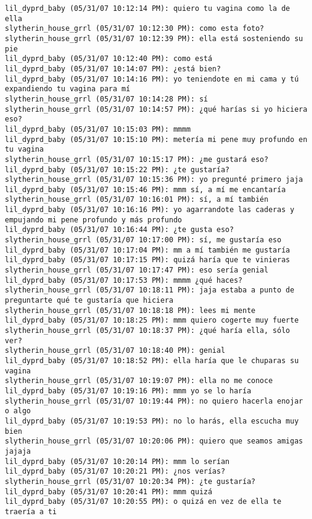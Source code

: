 \begin{verbatim}
lil_dyprd_baby (05/31/07 10:12:14 PM): quiero tu vagina como la de ella
slytherin_house_grrl (05/31/07 10:12:30 PM): como esta foto?
slytherin_house_grrl (05/31/07 10:12:39 PM): ella está sosteniendo su pie
lil_dyprd_baby (05/31/07 10:12:40 PM): como está
lil_dyprd_baby (05/31/07 10:14:07 PM): ¿está bien?
lil_dyprd_baby (05/31/07 10:14:16 PM): yo teniendote en mi cama y tú expandiendo tu vagina para mí
slytherin_house_grrl (05/31/07 10:14:28 PM): sí
slytherin_house_grrl (05/31/07 10:14:57 PM): ¿qué harías si yo hiciera eso?
lil_dyprd_baby (05/31/07 10:15:03 PM): mmmm
lil_dyprd_baby (05/31/07 10:15:10 PM): metería mi pene muy profundo en tu vagina
slytherin_house_grrl (05/31/07 10:15:17 PM): ¿me gustará eso?
lil_dyprd_baby (05/31/07 10:15:22 PM): ¿te gustaría? 
slytherin_house_grrl (05/31/07 10:15:36 PM): yo pregunté primero jaja
lil_dyprd_baby (05/31/07 10:15:46 PM): mmm sí, a mí me encantaría
slytherin_house_grrl (05/31/07 10:16:01 PM): sí, a mí también
lil_dyprd_baby (05/31/07 10:16:16 PM): yo agarrandote las caderas y empujando mi pene profundo y más profundo
lil_dyprd_baby (05/31/07 10:16:44 PM): ¿te gusta eso?
slytherin_house_grrl (05/31/07 10:17:00 PM): sí, me gustaría eso
lil_dyprd_baby (05/31/07 10:17:04 PM): mm a mí también me gustaría
lil_dyprd_baby (05/31/07 10:17:15 PM): quizá haría que te vinieras
slytherin_house_grrl (05/31/07 10:17:47 PM): eso sería genial
lil_dyprd_baby (05/31/07 10:17:53 PM): mmmm ¿qué haces?
slytherin_house_grrl (05/31/07 10:18:11 PM): jaja estaba a punto de preguntarte qué te gustaría que hiciera
slytherin_house_grrl (05/31/07 10:18:18 PM): lees mi mente
lil_dyprd_baby (05/31/07 10:18:25 PM): mmm quiero cogerte muy fuerte
slytherin_house_grrl (05/31/07 10:18:37 PM): ¿qué haría ella, sólo ver?
slytherin_house_grrl (05/31/07 10:18:40 PM): genial
lil_dyprd_baby (05/31/07 10:18:52 PM): ella haría que le chuparas su vagina
slytherin_house_grrl (05/31/07 10:19:07 PM): ella no me conoce
lil_dyprd_baby (05/31/07 10:19:16 PM): mmm yo se lo haría
slytherin_house_grrl (05/31/07 10:19:44 PM): no quiero hacerla enojar o algo
lil_dyprd_baby (05/31/07 10:19:53 PM): no lo harás, ella escucha muy bien
slytherin_house_grrl (05/31/07 10:20:06 PM): quiero que seamos amigas jajaja
lil_dyprd_baby (05/31/07 10:20:14 PM): mmm lo serían
lil_dyprd_baby (05/31/07 10:20:21 PM): ¿nos verías? 
slytherin_house_grrl (05/31/07 10:20:34 PM): ¿te gustaría?
lil_dyprd_baby (05/31/07 10:20:41 PM): mmm quizá
lil_dyprd_baby (05/31/07 10:20:55 PM): o quizá en vez de ella te traería a ti
\end{verbatim}
